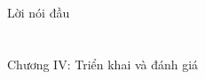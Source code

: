 \documentclass[a4paper, 12pt, twoside]{article}
\begin{document}

\renewcommand{\contentsname}
{\centering\vnmsans\Large\textcolor{vol}{Mục lục}}
{
  \hypersetup{linkcolor=black}
  \tableofcontents
}
\newpage
\section*{\label{preface}} 
{\centering\vnmsans\Large\textcolor{vol}{Lời nói đầu}\par}



% 

% 

% 

\newpage
\section*{\label{epNLP.3}} 
{\centering\vnmsans\Huge\textcolor{vol}{Chương IV: Triển khai và đánh giá}\par}

\end{document}
